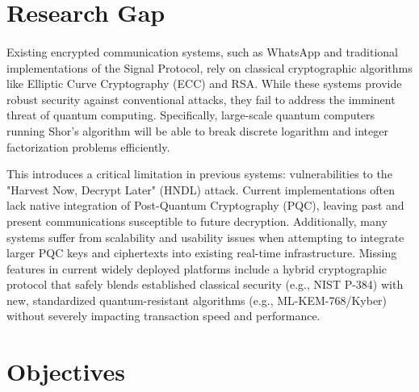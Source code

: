 \section{Research Gap}
\paragraph{}
Existing encrypted communication systems, such as WhatsApp and traditional implementations of the Signal Protocol, rely on classical cryptographic algorithms like Elliptic Curve Cryptography (ECC) and RSA. While these systems provide robust security against conventional attacks, they fail to address the imminent threat of quantum computing. Specifically, large-scale quantum computers running Shor's algorithm will be able to break discrete logarithm and integer factorization problems efficiently. 

This introduces a critical limitation in previous systems: vulnerabilities to the "Harvest Now, Decrypt Later" (HNDL) attack. Current implementations often lack native integration of Post-Quantum Cryptography (PQC), leaving past and present communications susceptible to future decryption. Additionally, many systems suffer from scalability and usability issues when attempting to integrate larger PQC keys and ciphertexts into existing real-time infrastructure. Missing features in current widely deployed platforms include a hybrid cryptographic protocol that safely blends established classical security (e.g., NIST P-384) with new, standardized quantum-resistant algorithms (e.g., ML-KEM-768/Kyber) without severely impacting transaction speed and performance.

\section{Objectives}
